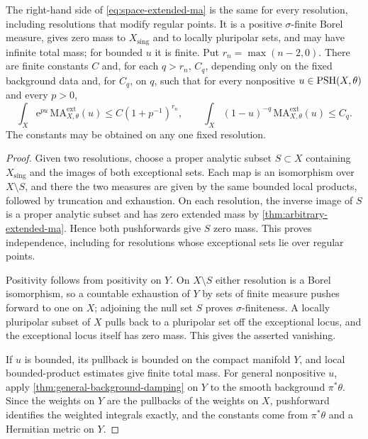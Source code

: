 \begin{theorem}\label{thm:space-extended-measures}
The right-hand side of \eqref{eq:space-extended-ma} is the same for every resolution, including resolutions that modify regular points. It is a positive $\sigma$-finite Borel measure, gives zero mass to $X_{\mathrm{sing}}$ and to locally pluripolar sets, and may have infinite total mass; for bounded $u$ it is finite. Put $r_n=\max(n-2,0)$. There are finite constants $C$ and, for each $q>r_n$, $C_q$, depending only on the fixed background data and, for $C_q$, on $q$, such that for every nonpositive $u\in\mathrm{PSH}(X,\theta)$ and every $p>0$,
\[
 \int_X\mathrm{e}^{pu}\,\mathrm{MA}^{\mathrm{ext}}_{X,\theta}(u)
       \leq C(1+p^{-1})^{r_n},\qquad
 \int_X(1-u)^{-q}\,\mathrm{MA}^{\mathrm{ext}}_{X,\theta}(u)
       \leq C_q.
\]
The constants may be obtained on any one fixed resolution.
\end{theorem}
\begin{proof}
Given two resolutions, choose a proper analytic subset $S\subset X$ containing $X_{\mathrm{sing}}$ and the images of both exceptional sets. Each map is an isomorphism over $X\setminus S$, and there the two measures are given by the same bounded local products, followed by truncation and exhaustion. On each resolution, the inverse image of $S$ is a proper analytic subset and has zero extended mass by \cref{thm:arbitrary-extended-ma}. Hence both pushforwards give $S$ zero mass. This proves independence, including for resolutions whose exceptional sets lie over regular points.

Positivity follows from positivity on $Y$. On $X\setminus S$ either resolution is a Borel isomorphism, so a countable exhaustion of $Y$ by sets of finite measure pushes forward to one on $X$; adjoining the null set $S$ proves $\sigma$-finiteness. A locally pluripolar subset of $X$ pulls back to a pluripolar set off the exceptional locus, and the exceptional locus itself has zero mass. This gives the asserted vanishing.

If $u$ is bounded, its pullback is bounded on the compact manifold $Y$, and local bounded-product estimates give finite total mass. For general nonpositive $u$, apply \cref{thm:general-background-damping} on $Y$ to the smooth background $\pi^*\theta$. Since the weights on $Y$ are the pullbacks of the weights on $X$, pushforward identifies the weighted integrals exactly, and the constants come from $\pi^*\theta$ and a Hermitian metric on $Y$.
\end{proof}


